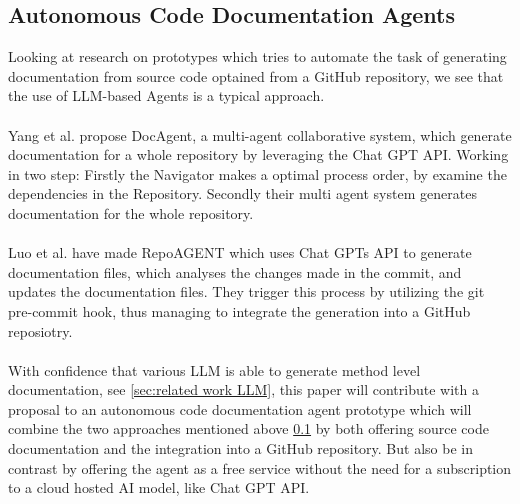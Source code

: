 \subsection{Autonomous Code Documentation Agents}
\label{sec: autonomus code documentaioin agents}
Looking at research on prototypes which tries to automate the task of generating documentation from source code optained from a GitHub repository, we see that the use of LLM-based Agents is a typical approach.
\\ \\
Yang et al.\cite{yang2025docagent} propose DocAgent, a multi-agent collaborative system, which generate documentation for a whole repository by leveraging the Chat GPT API. Working in two step: Firstly the Navigator makes a optimal process order, by examine the dependencies in the Repository. Secondly their multi agent system generates documentation for the whole repository.
\\ \\
Luo et al.\cite{luo2024repoagent} have made RepoAGENT which uses Chat GPTs API to generate documentation files, which analyses the changes made in the commit, and updates the documentation files. They  trigger this process by utilizing the git pre-commit hook, thus managing to integrate the generation into a GitHub reposiotry.
\\ \\
With confidence that various LLM is able to generate method level documentation, see \ref{sec:related work LLM}, this paper will contribute with a proposal to an autonomous code documentation agent prototype which will combine the two approaches mentioned above \ref{sec: autonomus code documentaioin agents} by both offering source code documentation and the integration into a GitHub repository. But also be in contrast by offering the agent as a free service without the need for a subscription to a cloud hosted AI model, like Chat GPT API.

